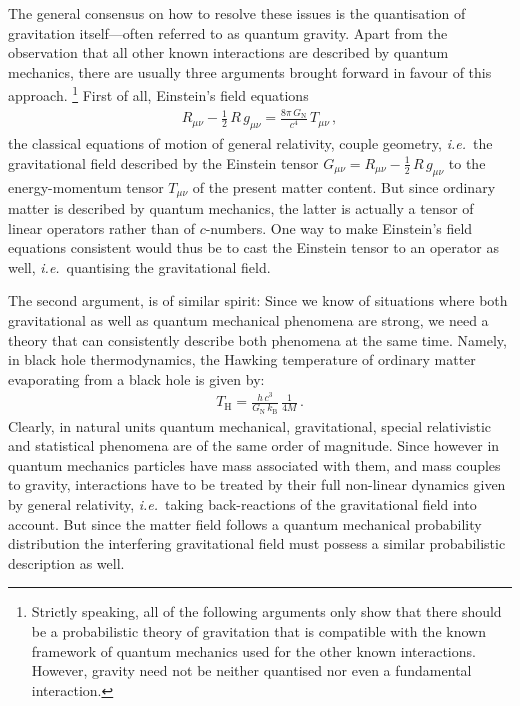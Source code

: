 \documentclass[11pt]{book} %
\newcommand\GNewton{ G_{\scriptscriptstyle{\mathrm{N}}} }
\newcommand\kBoltzmann{ k_{\scriptscriptstyle{\mathrm{B}}} }
\newcommand\THawking{ T_{\scriptscriptstyle{\mathrm{H}}} }
\newcommand\ie{\textit{i.e.}\ }
\numberwithin{equation}{chapter}
\begin{document}
The general consensus on how to resolve these issues is the quantisation of gravitation
itself---often referred to as quantum gravity.
Apart from the observation that all other known interactions are described by
quantum mechanics, there are usually three arguments brought forward in favour of this
approach.%
\footnote{
  Strictly speaking, all of the following arguments only show that there should be
  a probabilistic theory of gravitation that is compatible with the known
  framework of quantum mechanics used for the other known interactions.
  However, gravity need not be neither quantised nor even a fundamental interaction.
}%
First of all, Einstein's field equations
\begin{align*}
  R_{\mu \nu} - \tfrac{1}{2} \, R \, g_{\mu \nu} = \frac{8 \pi \, \GNewton }{c^4} \, T_{\mu \nu} \,,
\end{align*}
the classical equations of motion of general relativity, couple geometry, \ie the gravitational
field described by the Einstein tensor $G_{\mu\nu} = R_{\mu\nu} - \tfrac{1}{2} \, R \,g_{\mu\nu}$ to
the energy-momentum tensor $T_{\mu\nu}$ of the present matter content. But since ordinary matter
is described by quantum mechanics, the latter is actually a tensor of linear operators rather than
of $c$-numbers. One way to make Einstein's field equations consistent would thus be to
cast the Einstein tensor to an operator as well, \ie quantising the gravitational field.

The second argument, is of similar spirit: Since we know of situations where both gravitational
as well as quantum mechanical phenomena are strong, we need a theory that can consistently
describe both phenomena at the same time. Namely, in black hole thermodynamics,
the Hawking temperature of ordinary matter evaporating from a black hole is given by:
\begin{align*}
  \THawking = \frac{h \, c^3}{\GNewton \, \kBoltzmann} \, \frac {1}{4M} \,.
\end{align*}
Clearly, in natural units quantum mechanical, gravitational, special relativistic and
statistical phenomena are of the same order of magnitude. Since however in quantum mechanics
particles have mass associated with them, and mass couples to gravity, interactions have to
be treated by their full non-linear dynamics given by general relativity,
\ie taking back-reactions of the gravitational
field into account. But since the matter field follows a quantum mechanical probability distribution
the interfering gravitational field must possess a similar probabilistic description as well.
\end{document}
